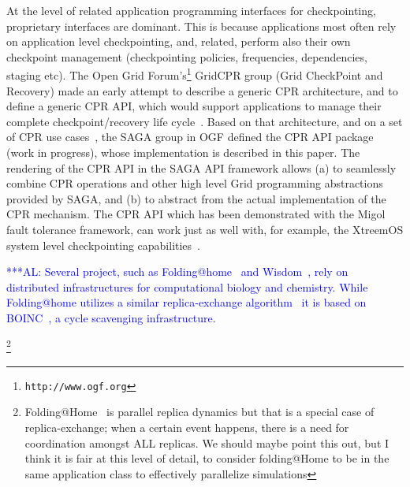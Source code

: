 \documentclass[times, 10pt, twocolumn]{article}
\newcommand{\kimnote}[1]{ {\textcolor{green} { ***JK: #1 }}}
\newcommand{\alnote}[1]{ {\textcolor{blue} { ***AL: #1 }}}
\newcommand{\jhanote}[1]{ {\textcolor{red} { ***SJ: #1 }}}
\newcommand{\kimnote}[1]{}
\newcommand{\alnote}[1]{}
\newcommand{\jhanote}[1]{}
\begin{document}
At the level of related application programming interfaces for
checkpointing, proprietary interfaces are dominant. This is because
applications most often rely on application level checkpointing, and,
related, perform also their own checkpoint management (checkpointing
policies, frequencies, dependencies, staging etc).  The Open Grid
Forum's\footnote{\texttt{http://www.ogf.org}} GridCPR group (Grid
CheckPoint and Recovery) made an early attempt to describe a generic
CPR architecture, and to define a generic CPR API, which would support
applications to manage their complete checkpoint/recovery life
cycle~\cite{ogf_cpr_arch}.  Based on that architecture, and on a set
of CPR use cases~\cite{ogf_cpr_uc}, the SAGA group in OGF defined the
CPR API package~\cite{ogf_cpr_draft} (work in progress), whose
implementation is described in this paper.  The rendering of the CPR
API in the SAGA API framework allows (a) to seamlessly combine CPR
operations and other high level Grid programming abstractions provided
by SAGA, and (b) to abstract from the actual implementation of the CPR
mechanism.  The CPR API which has been demonstrated with the Migol
fault tolerance framework, can work just as well with, for example,
the XtreemOS system level checkpointing
capabilities~\cite{xtreemos_cpr}.



\alnote{Several project, such as Folding@home~\cite{folding} and
  Wisdom~\cite{wisdom}, rely on distributed infrastructures for
  computational biology and chemistry. While Folding@home utilizes a
  similar replica-exchange algorithm~\cite{PhysRevLett.86.4983} it is
  based on BOINC~\cite{1033223}, a cycle scavenging infrastructure.}


\footnote{Folding@Home~\cite{PhysRevLett.86.4983} is parallel replica
  dynamics but that is a special case of replica-exchange; when a
  certain event happens, there is a need for coordination amongst ALL
  replicas. We should maybe point this out, but I think it is fair at
  this level of detail, to consider folding@Home to be in the same
  application class to effectively parallelize simulations}
\end{document}
